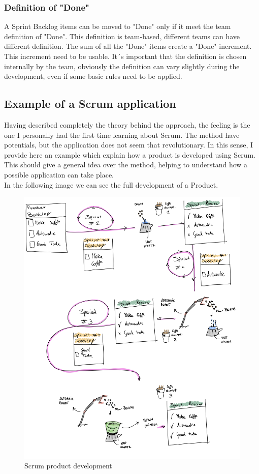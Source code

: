\documentclass[../main.tex]{subfiles}
\begin{document}
\subsubsection{Definition of "Done"}
A Sprint Backlog items can be moved to "Done" only if it meet the team definition of "Done". This definition is team-based, different teams can have different definition. The sum of all the "Done" items create a "Done" increment. This increment need to be usable. It´s important that the definition is chosen internally by the team, obviously the definition can vary slightly during the development, even if some basic rules need to be applied.
\subsection{Example of a Scrum application}
Having described completely the theory behind the approach, the feeling is the one I personally had the first time learning about Scrum. The method have potentials, but the application does not seem that revolutionary. In this sense, I provide here an example which explain how a product is developed using Scrum. This should give a general idea over the method, helping to understand how a possible application can take place. \\
In the following image we can see the full development of a Product.\\
\begin{figure}[htp]
    \centering
    \includegraphics[width=\linewidth]{images_folder/scrum.png}
    \caption{Scrum product development}
    \label{fig:scrumprddev}
\end{figure}
\end{document}
